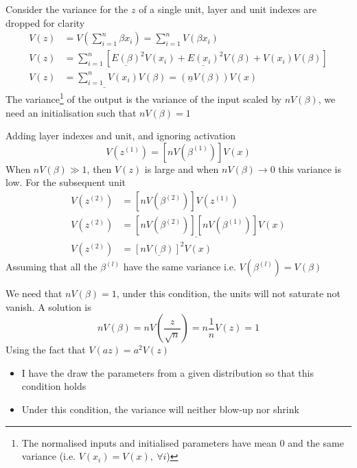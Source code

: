 \documentclass[c]{beamer}
\begin{document}
\begin{frame}{\secsubname}
	\small
	Consider the variance for the $z$ of a single unit, layer and unit indexes are dropped for clarity
	\begin{align} 
		V(z) &= V\left(\sum_{i=1}^n \beta x_i\right) = \sum_{i=1}^n V\left(\beta x_i\right) \nonumber \\
		V(z) &= \sum_{i=1}^n \left[\underline{E(\beta)}^2 V(x_i) + \underline{E(x_i)}^2 V(\beta) + V(x_i) V(\beta) \right] \nonumber \\
		V(z) &= \underline{\sum_{i=1}^n} V(x_i) V(\beta)
		= \left(\underline{n} V(\beta) \right) V(x) 
	\end{align}
	The variance\footnote{The normalised inputs and initialised parameters have mean 0 and the same variance (i.e. $V(x_i) = V(x),\ \forall i$)} of the output is the variance of the input scaled by $nV(\beta)$, we need an initialisation such that $nV(\beta) = 1$
\end{frame}

\begin{frame}{\secsubname}
	Adding layer indexes and unit, and ignoring activation
	\begin{equation*}
		V(z^{(1)}) = \left[n V\left(\beta^{(1)}\right)\right] V(x)
	\end{equation*}
	When $n V(\beta) \gg 1$, then $V(z)$ is large and when $n V(\beta) \rightarrow 0$ this variance is low. For the subsequent unit
	\begin{align*}
		V(z^{(2)}) &= \left[n V\left(\beta^{(2)}\right)\right] V(z^{(1)}) \\
		V(z^{(2)}) &= \underline{\left[n V\left(\beta^{(2)}\right)\right] \left[n V\left(\beta^{(1)}\right)\right]} V(x)
		\\
		V(z^{(2)}) &= \underline{\left[n V(\beta)\right]^2} V(x)
	\end{align*}
	Assuming that all the $\beta^{(l)}$ have the same variance i.e. $V\left(\beta^{(l)}\right) = V(\beta)$
\end{frame}

\begin{frame}{\secsubname}
	We need that $nV(\beta) = 1$, under this condition, the units will not saturate not vanish. A solution is
	\begin{equation}
		nV(\beta) = nV\left(\frac{z}{\sqrt{n}}\right) = n\frac{1}{n}V(z) = 1
	\end{equation}
	Using the fact that $V(az) = a^2V(z)$
	\begin{itemize}
		\item I have the draw the parameters from a given distribution so that this condition holds
		\item Under this condition, the variance will neither blow-up nor shrink 
	\end{itemize}
\end{frame}
\end{document}

